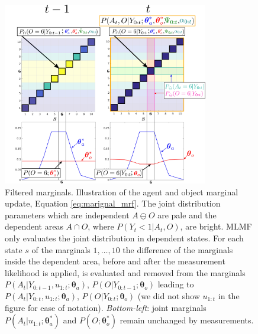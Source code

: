 \documentclass{frontiersSCNS} %
\newcommand{\ThAs}{\boldsymbol{\theta}^*_a}
\newcommand{\ThOs}{\boldsymbol{\theta}^*_o}
\newcommand{\ThA}{\boldsymbol{\theta}_a}
\newcommand{\ThO}{\boldsymbol{\theta}_o}
\begin{document}
\begin{figure}
\centering
\includegraphics[width=0.8\textwidth]{Figure7}
\caption{Filtered marginals. Illustration of the agent and object marginal update, Equation \ref{eq:marignal_mrf}. The joint 
distribution parameters which are independent $A \ominus O$ are pale and the dependent areas $A \cap O$, where $P(Y_t<1|A_t,O)$, are bright. MLMF only
evaluates the joint distribution in dependent states. For each state $s$ of the marginals $1,\dots,10$ the difference 
of the marginals inside the dependent area, before and after the measurement likelihood is applied, is evaluated and removed from the marginals 
$P(A_t|Y_{0:t-1},u_{1:t};\ThA)$, $P(O|Y_{0:t-1};\ThO)$ leading to $P(A_t|Y_{0:t},u_{1:t};\ThA)$, $P(O|Y_{0:t};\ThO)$ (we did not show $u_{1:t}$ in the figure for ease of notation). 
\textit{Bottom-left}: joint marginals $P(A_t|u_{1:t};\ThAs)$ and $P(O;\ThOs)$ remain unchanged by measurements.}
\label{fig:marginal_update}
\end{figure}
\end{document}
